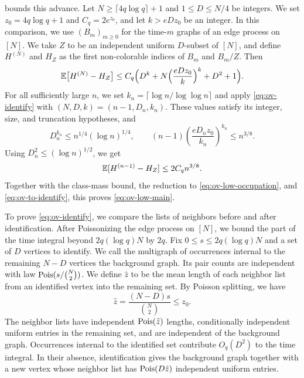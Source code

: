  bounds this advance. Let $N \ge \lceil4q\log q\rceil + 1$ and $1 \le D \le N/4$ be integers. We set $z_0 = 4q\log q + 1$ and $C_q = 2e^{z_0}$, and let $k > eDz_0$ be an integer. In this comparison, we use $(B_m)_{m \ge 0}$ for the time-$m$ graphs of an edge process on $[N]$. We take $Z$ to be an independent uniform $D$-subset of $[N]$, and define $H^{(N)}$ and $H_Z$ as the first non-colorable indices of $B_m$ and $B_m/Z$. Then
\begin{equation}\label{eq:ov-identify}
\mathbb E\bigl[H^{(N)} - H_Z\bigr] \le C_q \Bigl(D^k + N \Bigl(\frac{e D z_0}{k}\Bigr)^k + D^2 + 1\Bigr).
\end{equation}
For all sufficiently large $n$, we set $k_n = \lceil\log n/\log\log n\rceil$ and apply \eqref{eq:ov-identify} with $(N, D, k) = (n - 1, D_n, k_n)$. These values satisfy its integer, size, and truncation hypotheses, and
\[
D_n^{k_n} \le n^{1/4}(\log n)^{1/4}, \qquad
(n - 1)\left(\frac{eD_nz_0}{k_n}\right)^{k_n} \le n^{3/8}.
\]
Using $D_n^2 \le (\log n)^{1/2}$, we get
\[
\mathbb E[H^{(n - 1)} - H_Z] \le 2C_qn^{3/8}.
\]
Together with the class-mass bound, the reduction to \eqref{eq:ov-low-occupation}, and \eqref{eq:ov-to-identify}, this proves \eqref{eq:ov-low-main}.

To prove \eqref{eq:ov-identify}, we compare the lists of neighbors before and after identification. After Poissonizing the edge process on $[N]$, we bound the part of the time integral beyond $2q(\log q)N$ by $2q$. Fix $0 \le s \le 2q(\log q)N$ and a set of $D$ vertices to identify. We call the multigraph of occurrences internal to the remaining $N - D$ vertices the background graph. Its pair counts are independent with law $\operatorname{Pois}(s/\binom N2)$. We define $\hat z$ to be the mean length of each neighbor list from an identified vertex into the remaining set. By Poisson splitting, we have
\[
\hat z = \frac{(N - D)s}{\binom N2} \le z_0.
\]
The neighbor lists have independent $\operatorname{Pois}(\hat z)$ lengths, conditionally independent uniform entries in the remaining set, and are independent of the background graph. Occurrences internal to the identified set contribute $O_q(D^2)$ to the time integral. In their absence, identification gives the background graph together with a new vertex whose neighbor list has $\operatorname{Pois}(D\hat z)$ independent uniform entries.

